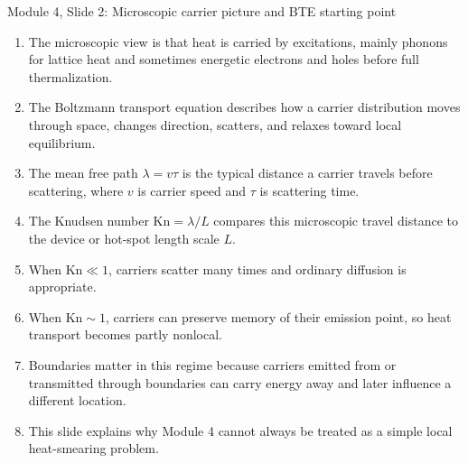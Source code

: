 \documentclass[11pt]{article}
\begin{document}
\begin{slidebox}{Module 4, Slide 2: Microscopic carrier picture and BTE starting point}
\begin{enumerate}
\item The microscopic view is that heat is carried by excitations, mainly phonons for lattice heat and sometimes energetic electrons and holes before full thermalization.
\item The Boltzmann transport equation describes how a carrier distribution moves through space, changes direction, scatters, and relaxes toward local equilibrium.
\item The mean free path \(\lambda=v\tau\) is the typical distance a carrier travels before scattering, where \(v\) is carrier speed and \(\tau\) is scattering time.
\item The Knudsen number \(\mathrm{Kn}=\lambda/L\) compares this microscopic travel distance to the device or hot-spot length scale \(L\).
\item When \(\mathrm{Kn}\ll 1\), carriers scatter many times and ordinary diffusion is appropriate.
\item When \(\mathrm{Kn}\sim 1\), carriers can preserve memory of their emission point, so heat transport becomes partly nonlocal.
\item Boundaries matter in this regime because carriers emitted from or transmitted through boundaries can carry energy away and later influence a different location.
\item This slide explains why Module 4 cannot always be treated as a simple local heat-smearing problem.
\end{enumerate}
\end{slidebox}
\end{document}
